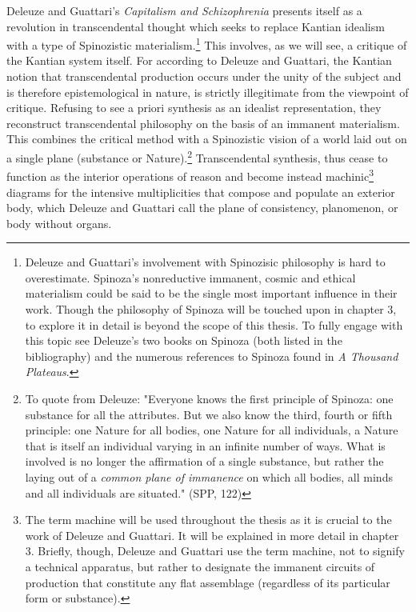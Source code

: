 Deleuze and Guattari's \textit{Capitalism and Schizophrenia} presents itself as a revolution in transcendental thought which seeks to replace Kantian idealism with a type of Spinozistic materialism.\footnote{Deleuze and Guattari's involvement with Spinozisic philosophy is hard to overestimate. Spinoza's nonreductive immanent, cosmic and ethical materialism could be said to be the single most important influence in their work. Though the philosophy of Spinoza will be touched upon in chapter 3, to explore it in detail is beyond the scope of this thesis. To fully engage with this topic see Deleuze's two books on Spinoza (both listed in the bibliography) and the numerous references to Spinoza found in \textit{A Thousand Plateaus}.} This involves, as we will see, a critique of the Kantian system itself. For according to Deleuze and Guattari, the Kantian notion that transcendental production occurs under the unity of the subject and is therefore epistemological in nature, is strictly illegitimate from the viewpoint of critique. Refusing to see a priori synthesis as an idealist representation, they reconstruct transcendental philosophy on the basis of an immanent materialism. This combines the critical method with a Spinozistic vision of a world laid out on a single plane (substance or Nature).\footnote{ To quote from Deleuze: "Everyone knows the first principle of Spinoza: one substance for all the attributes. But we also know the third, fourth or fifth principle: one Nature for all bodies, one Nature for all individuals, a Nature that is itself an individual varying in an infinite number of ways. What is involved is no longer the affirmation of a single substance, but rather the laying out of a \textit{common plane of immanence} on which all bodies, all minds and all individuals are situated." (SPP, 122)} Transcendental synthesis, thus cease to function as the interior operations of reason and become instead machinic\footnote{The term machine will be used throughout the thesis as it is crucial to the work of Deleuze and Guattari. It will be explained in more detail in chapter 3. Briefly, though, Deleuze and Guattari use the term machine, not to signify a technical apparatus, but rather to designate the immanent circuits of production that constitute any flat assemblage (regardless of its particular form or substance).} diagrams for the intensive multiplicities that compose and populate an exterior body, which Deleuze and Guattari call the plane of consistency, planomenon, or body without organs.

